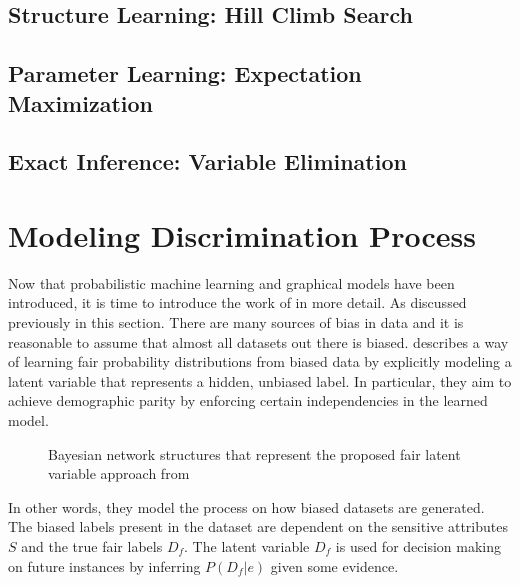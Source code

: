 \subsection{Structure Learning: Hill Climb Search}
\label{HillClimbSearch}

\subsection{Parameter Learning: Expectation Maximization}
\label{Expectation Maximization}

\subsection{Exact Inference: Variable Elimination}
\label{Variable Elimination}

\section{Modeling Discrimination Process}
\label{sec:paper1}
Now that probabilistic machine learning and graphical models have been introduced, it is time to introduce the work of \citet{Choi:2021:AIII} in more detail. As discussed previously in this section. There are many sources of bias in data and it is reasonable to assume that almost all datasets out there is biased. \citet{Choi:2021:AIII} describes a way of learning fair probability distributions from biased data by explicitly modeling a latent variable that represents a hidden, unbiased label. In particular, they aim to achieve demographic parity by enforcing
certain independencies in the learned model.

\begin{figure}[h!]
    \centering
    \caption{Bayesian network structures that represent the proposed
fair latent variable approach from \cite{Choi:2021:AIII}}
    \label{fig:choinetwork}
\end{figure}

In other words, they model the process on how biased datasets are generated. The biased labels present in the dataset are dependent on the sensitive attributes $S$ and the true fair labels $D_f$. The latent variable $D_f$ is used for decision making on future instances by inferring $P(D_f|e)$ given some evidence.

